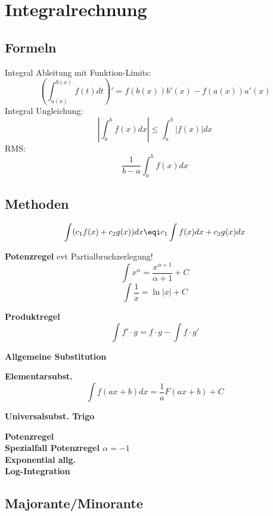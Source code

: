 \section{Integralrechnung}

\subsection{Formeln}
\noindent Integral Ableitung mit Funktion-Limits: \[\left(\int_{a(x)}^{b(x)}f(t)dt\right)' = f(b(x))b'(x) - f(a(x))a'(x)\]
\noindent Integral Ungleichung:
\[\left|\int_{a}^{b}f(x)dx\right| \leq \int_{a}^{b}\left|f(x)\right|dx\]
\noindent RMS: 
\[\frac{1}{b-a}\int_{a}^{b}f(x)dx\]



\subsection{Methoden}
\[
\int(c_1f(x) + c_2g(x))dx \eqi c_1 \int f(x)dx + c_2 g(x) dx
\]

\textbf{Potenzregel} evt Partialbruchzerlegung!
\[
\int x^\alpha = \frac{x^{\alpha  + 1}}{\alpha + 1} + C
\]
\[
\int \frac{1}{x} = \ln\left|x\right| + C
\]

\textbf{Produktregel}
\[
\int f' \cdot g = f \cdot g - \int f \cdot g'
\]

\textbf{Allgemeine Substitution}

\textbf{Elementarsubst.}
\[
\int f(ax + b)dx = \frac{1}{a}F(ax+b)+C
\]

\textbf{Universalsubst. Trigo}\\


\textbf{Potenzregel}\\
\textbf{Spezialfall Potenzregel $\alpha = -1$}\\
\textbf{Exponential allg.}\\
\textbf{Log-Integration}

\subsection{Majorante/Minorante}
